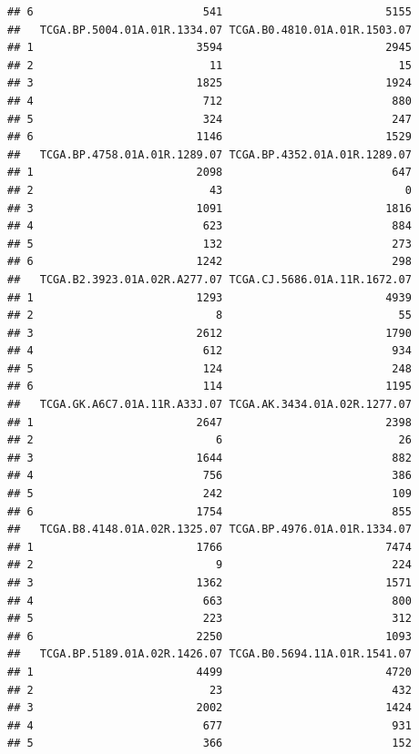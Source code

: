 \documentclass[
]{article}
\begin{document}
\begin{verbatim}
## 6                          541                         5155
##   TCGA.BP.5004.01A.01R.1334.07 TCGA.B0.4810.01A.01R.1503.07
## 1                         3594                         2945
## 2                           11                           15
## 3                         1825                         1924
## 4                          712                          880
## 5                          324                          247
## 6                         1146                         1529
##   TCGA.BP.4758.01A.01R.1289.07 TCGA.BP.4352.01A.01R.1289.07
## 1                         2098                          647
## 2                           43                            0
## 3                         1091                         1816
## 4                          623                          884
## 5                          132                          273
## 6                         1242                          298
##   TCGA.B2.3923.01A.02R.A277.07 TCGA.CJ.5686.01A.11R.1672.07
## 1                         1293                         4939
## 2                            8                           55
## 3                         2612                         1790
## 4                          612                          934
## 5                          124                          248
## 6                          114                         1195
##   TCGA.GK.A6C7.01A.11R.A33J.07 TCGA.AK.3434.01A.02R.1277.07
## 1                         2647                         2398
## 2                            6                           26
## 3                         1644                          882
## 4                          756                          386
## 5                          242                          109
## 6                         1754                          855
##   TCGA.B8.4148.01A.02R.1325.07 TCGA.BP.4976.01A.01R.1334.07
## 1                         1766                         7474
## 2                            9                          224
## 3                         1362                         1571
## 4                          663                          800
## 5                          223                          312
## 6                         2250                         1093
##   TCGA.BP.5189.01A.02R.1426.07 TCGA.B0.5694.11A.01R.1541.07
## 1                         4499                         4720
## 2                           23                          432
## 3                         2002                         1424
## 4                          677                          931
## 5                          366                          152

\end{verbatim}
\end{document}
